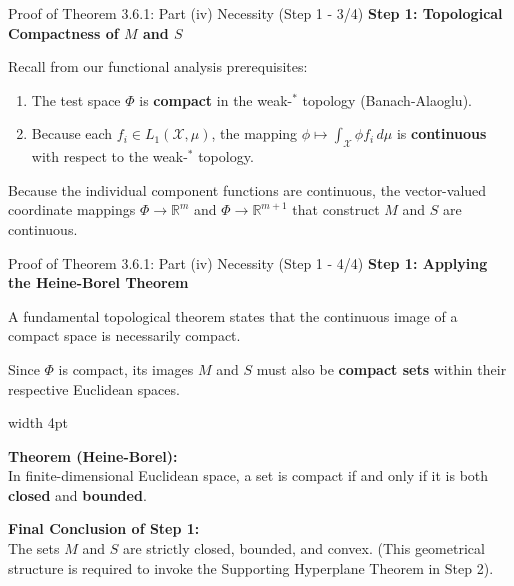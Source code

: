 \documentclass[10pt, aspectratio=169, xcolor=dvipsnames]{beamer}
\newcommand{\lead}[1]{{\color{UniBlue}\bfseries #1}}
\begin{document}
\begin{frame}{Proof of Theorem 3.6.1: Part (iv) Necessity (Step 1 - 3/4)}
    \lead{Step 1: Topological Compactness of $M$ and $S$}\\
    \vspace{0.4cm}
    
    Recall from our functional analysis prerequisites:
    \vspace{0.2cm}
    \begin{enumerate}
        \item The test space $\Phi$ is \textbf{compact} in the weak-$^\ast$ topology (Banach-Alaoglu).
        \vspace{0.3cm}
        \item Because each $f_i \in L_1(\mathcal{X}, \mu)$, the mapping $\phi \mapsto \int_{\mathcal{X}} \phi f_i \, d\mu$ is \textbf{continuous} with respect to the weak-$^\ast$ topology.
    \end{enumerate}
    
    \vspace{0.5cm}
    Because the individual component functions are continuous, the vector-valued coordinate mappings $\Phi \to \mathbb{R}^m$ and $\Phi \to \mathbb{R}^{m+1}$ that construct $M$ and $S$ are continuous.
\end{frame}

\begin{frame}{Proof of Theorem 3.6.1: Part (iv) Necessity (Step 1 - 4/4)}
    \lead{Step 1: Applying the Heine-Borel Theorem}\\
    \vspace{0.4cm}
    
    A fundamental topological theorem states that the continuous image of a compact space is necessarily compact. 
    
    \vspace{0.2cm}
    Since $\Phi$ is compact, its images $M$ and $S$ must also be \textbf{compact sets} within their respective Euclidean spaces.
    
    \vspace{0.4cm}
    \noindent
    {\color{Teal}\vrule width 4pt}%
    \hspace{10pt}%
    \begin{minipage}{\dimexpr\textwidth-14pt\relax}
        \color{Slate}
        \textbf{Theorem (Heine-Borel):}\\
        In finite-dimensional Euclidean space, a set is compact if and only if it is both \textbf{closed} and \textbf{bounded}.
        
        \vspace{0.3cm}
        \textbf{Final Conclusion of Step 1:}\\
        The sets $M$ and $S$ are strictly closed, bounded, and convex. (This geometrical structure is required to invoke the Supporting Hyperplane Theorem in Step 2).
    \end{minipage}
\end{frame}
\end{document}
